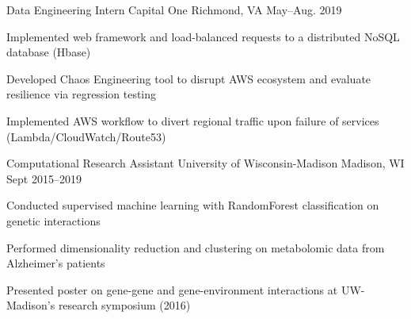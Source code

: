 \documentclass[10pt, letterpaper]{awesome-cv}
\begin{document}
\begin{cventries}
    
    \cventry
        {Data Engineering Intern}
        {Capital One}
        {Richmond, VA}
        {May--Aug. 2019}
        {\begin{cvitems} 
            \item Implemented web framework and load-balanced requests to a distributed NoSQL database (Hbase)
            \item Developed Chaos Engineering tool to disrupt AWS ecosystem and evaluate resilience via regression testing 
            \item Implemented AWS workflow to divert regional traffic upon failure of services (Lambda/CloudWatch/Route53)
        \end{cvitems}}
        
    \cventry
        {Computational Research Assistant}
        {University of Wisconsin-Madison}
        {Madison, WI}
        {Sept 2015--2019}
        {\begin{cvitems} 
            \item Conducted supervised machine learning with RandomForest classification on genetic interactions
            \item Performed dimensionality reduction and clustering on metabolomic data from Alzheimer's patients
            \item Presented poster on gene-gene and gene-environment interactions at UW-Madison's research symposium (2016) 
        \end{cvitems}}
    
        

\end{cventries}
\end{document}
